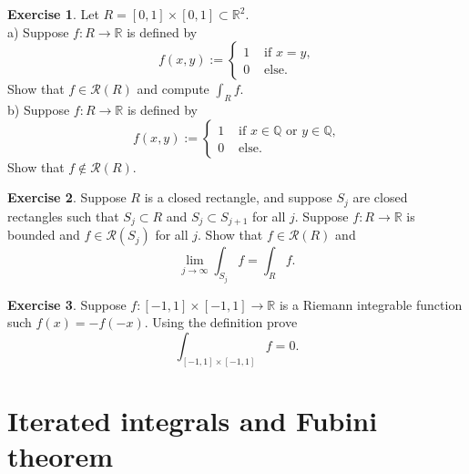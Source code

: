 \documentclass[12pt]{book}
\newcommand{\R}{{\mathbb{R}}}
\newcommand{\Q}{{\mathbb{Q}}}
\newcommand{\sR}{{\mathcal{R}}}
\newcommand{\sectionnewpage}{\clearpage}
\theoremstyle{plain}
\theoremstyle{remark}
\theoremstyle{definition}
\theoremstyle{exercise}
\newtheorem{exercise}{Exercise}[section]
\theoremstyle{example}
\begin{document}
\begin{samepage}
\begin{exercise}
Let $R = [0,1] \times [0,1] \subset \R^2$.\\
a) Suppose $f \colon R \to \R$ is defined by
\begin{equation*}
f(x,y) := 
\begin{cases}
1 & \text{ if $x = y$,} \\
0 & \text{ else.}
\end{cases}
\end{equation*}
Show that $f \in \sR(R)$ and compute $\int_R f$.
\\
b) Suppose $f \colon R \to \R$ is defined by
\begin{equation*}
f(x,y) := 
\begin{cases}
1 & \text{ if $x \in \Q$ or $y \in \Q$,} \\
0 & \text{ else.}
\end{cases}
\end{equation*}
Show that $f \notin \sR(R)$.
\end{exercise}
\end{samepage}

\begin{exercise}
Suppose $R$ is a closed rectangle, and suppose $S_j$ are closed rectangles
such that $S_j \subset R$ and $S_j \subset S_{j+1}$ for all $j$.
Suppose $f \colon R \to \R$ is bounded and $f \in \sR(S_j)$ for all $j$.
Show that $f \in \sR(R)$ and
\begin{equation*}
\lim_{j\to\infty} \int_{S_j} f = \int_R f .
\end{equation*}
\end{exercise}

\begin{exercise}
Suppose $f\colon [-1,1] \times [-1,1] \to \R$ is a Riemann
integrable function such $f(x) = -f(-x)$.  Using the definition prove
\begin{equation*}
\int_{[-1,1] \times [-1,1]} f = 0 .
\end{equation*}
\end{exercise}


\sectionnewpage
\section{Iterated integrals and Fubini theorem}
\label{sec:iteratedints}
\end{document}
